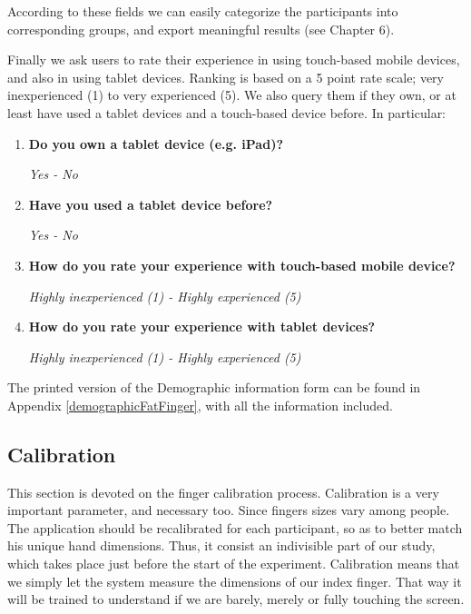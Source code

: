 According to these fields we can easily categorize the participants into corresponding groups, and export meaningful results (see Chapter 6).

Finally we ask users to rate their experience in using touch-based mobile devices, and also in using tablet devices. Ranking is based on a 5 point rate scale; very inexperienced (1) to very experienced (5). We also query them if they own, or at least have used a tablet devices and a touch-based device before. In particular:

\begin{enumerate}
	\item \textbf{Do you own a tablet device (e.g. iPad)?}

	\emph{Yes - No}
	\item \textbf{Have you used a tablet device before?}
	
	\emph{Yes - No}
	\item \textbf{How do you rate your experience with touch-based mobile device?}

	\emph{Highly inexperienced (1) - Highly experienced (5)}
	\item \textbf{How do you rate your experience with tablet devices?}

	\emph{Highly inexperienced (1) - Highly experienced (5)}
\end{enumerate}


The printed version of the Demographic information form can be found in Appendix \ref{demographicFatFinger}, with all the information included. 




\subsection{Calibration}

This section is devoted on the finger calibration process. Calibration is a very important parameter, and necessary too. Since fingers sizes vary among people. The application should be recalibrated for each participant, so as to better match his unique hand dimensions. Thus, it consist an indivisible part of our study, which takes place just before the start of the experiment. Calibration means that we simply let the system measure the dimensions of our index finger. That way it will be trained to understand if we are barely, merely or fully touching the screen.

